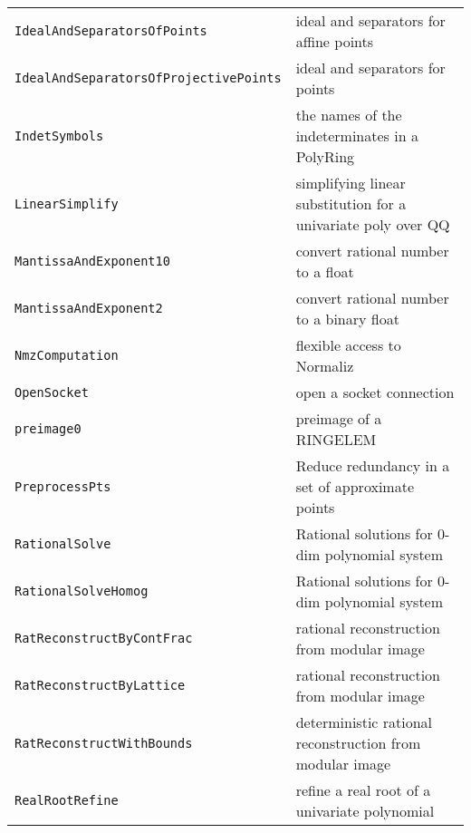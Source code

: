\documentclass[a4paper]{mybook}
\begin{document}
\begin{center}
\begin{longtable}{ll}
{\verb~IdealAndSeparatorsOfPoints~} &
      ideal and separators for affine points\\
   
{\verb~IdealAndSeparatorsOfProjectivePoints~} &
      ideal and separators for points\\
   
{\verb~IndetSymbols~} &
      the names of the indeterminates in a PolyRing\\
   
{\verb~LinearSimplify~} &
      simplifying linear substitution for a univariate poly over QQ\\
   
{\verb~MantissaAndExponent10~} &
      convert rational number to a float\\
   
{\verb~MantissaAndExponent2~} &
      convert rational number to a binary float\\
   
{\verb~NmzComputation~} &
      flexible access to Normaliz\\
   
{\verb~OpenSocket~} &
      open a socket connection\\
   
{\verb~preimage0~} &
      preimage of a RINGELEM\\
   
{\verb~PreprocessPts~} &
      Reduce redundancy in a set of approximate points\\
   
{\verb~RationalSolve~} &
      Rational solutions for 0-dim polynomial system\\
   
{\verb~RationalSolveHomog~} &
      Rational solutions for 0-dim polynomial system\\
   
{\verb~RatReconstructByContFrac~} &
      rational reconstruction from modular image\\
   
{\verb~RatReconstructByLattice~} &
      rational reconstruction from modular image\\
   
{\verb~RatReconstructWithBounds~} &
      deterministic rational reconstruction from modular image\\
   
{\verb~RealRootRefine~} &
      refine a real root of a univariate polynomial\\
   

\end{longtable}
\end{center}
\end{document}
